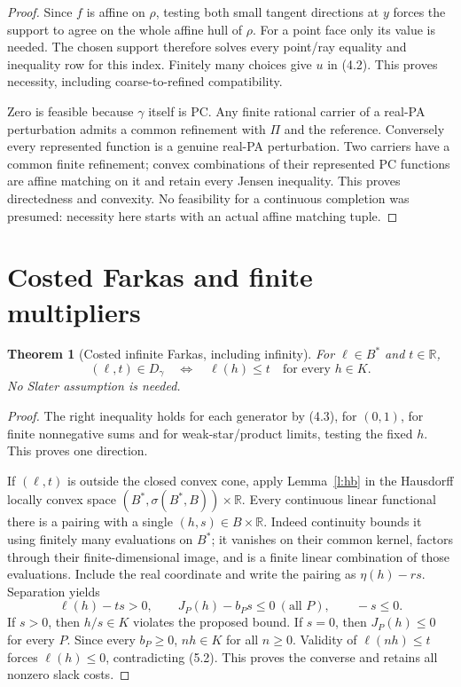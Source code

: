 \documentclass[11pt]{article}
\newtheorem{theorem}{Theorem}[section]
\newcommand{\R}{\mathbb R}\newcommand{\Q}{\mathbb Q}\newcommand{\Z}{\mathbb Z}
\begin{document}
\begin{proof}
Since $f$ is affine on $\rho$, testing both small tangent directions at $y$ forces the support to agree on the whole affine hull of $\rho$. For a point face only its value is needed. The chosen support therefore solves every point/ray equality and inequality row for this index. Finitely many choices give $u$ in (4.2). This proves necessity, including coarse-to-refined compatibility.

Zero is feasible because $\gamma$ itself is PC. Any finite rational carrier of a real-PA perturbation admits a common refinement with $\Pi$ and the reference. Conversely every represented function is a genuine real-PA perturbation. Two carriers have a common finite refinement; convex combinations of their represented PC functions are affine matching on it and retain every Jensen inequality. This proves directedness and convexity. No feasibility for a continuous completion was presumed: necessity here starts with an actual affine matching tuple.
\end{proof}

\section{Costed Farkas and finite multipliers}
\begin{theorem}[Costed infinite Farkas, including infinity]\label{t:farkas}
For $\ell\in B^*$ and $t\in\R$,
\[
 (\ell,t)\in D_\gamma\quad\Longleftrightarrow\quad
 \ell(h)\leq t\quad\text{for every }h\in K.                          \tag{5.1}
\]
No Slater assumption is needed.
\end{theorem}
\begin{proof}
The right inequality holds for each generator by (4.3), for $(0,1)$, for finite nonnegative sums and for weak-star/product limits, testing the fixed $h$. This proves one direction.

If $(\ell,t)$ is outside the closed convex cone, apply Lemma~\ref{l:hb} in the Hausdorff locally convex space $(B^*,\sigma(B^*,B))\times\R$. Every continuous linear functional there is a pairing with a single $(h,s)\in B\times\R$. Indeed continuity bounds it using finitely many evaluations on $B^*$; it vanishes on their common kernel, factors through their finite-dimensional image, and is a finite linear combination of those evaluations. Include the real coordinate and write the pairing as $\eta(h)-rs$. Separation yields
\[
 \ell(h)-ts>0,\qquad J_P(h)-b_Ps\leq0\ (\text{all }P),\qquad -s\leq0.
                                                                    \tag{5.2}
\]
If $s>0$, then $h/s\in K$ violates the proposed bound. If $s=0$, then $J_P(h)\leq0$ for every $P$. Since every $b_P\geq0$, $nh\in K$ for all $n\geq0$. Validity of $\ell(nh)\leq t$ forces $\ell(h)\leq0$, contradicting (5.2). This proves the converse and retains all nonzero slack costs.
\end{proof}
\end{document}
